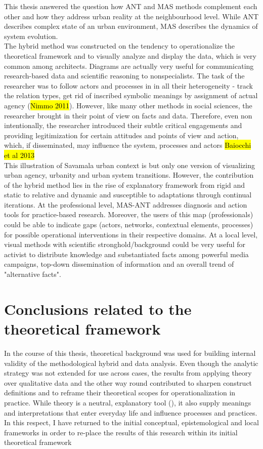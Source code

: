\documentclass[11pt]{report}
\begin{document}
This thesis answered the question how ANT and MAS methods complement each other and how they address urban reality at the neighbourhood level.
While ANT describes complex state of an urban environment, MAS describes the dynamics of system evolution.
\\
The hybrid method was constructed on the tendency to operationalize the theoretical framework and to visually analyze and display the data, which is very common among architects.
Diagrams are actually very useful for communicating research-based data and scientific reasoning to nonspecialists.
The task of the researcher was to follow actors and processes in in all their heterogeneity - track the relation types,  get rid of inscribed symbolic meanings by assignment of actual agency (\hl{Nimmo 2011}).
However, like many other methods in social sciences, 
the researcher brought in their point of view on facts and data.
Therefore, even non intentionally, the researcher introduced their subtle critical engagements and providing legitimization for certain attitudes and points of view and action, which, if disseminated, may influence the system, processes and actors \hl{Baiocchi et al 2013}
\\
This illustration of Savamala urban context is but only one version of visualizing urban agency, urbanity and urban system transitions.
However, the contribution of the hybrid method lies in the rise of explanatory framework from rigid and static to relative and dynamic and susceptible to adaptations through continual iterations.
At the professional level, MAS-ANT addresses diagnosis and action tools for practice-based research.
Moreover, the users of this map (professionals) could be able to indicate gaps (actors, networks, contextual elements, processes) for possible operational interventions in their respective domains.
At a local level, visual methods with scientific stronghold/background could be very useful for activist to distribute knowledge and substantiated facts among powerful media campaigns, top-down dissemination of information and an overall trend of "alternative facts".

\section{Conclusions related to the theoretical framework}

In the course of this thesis, theoretical background was used for building internal validity of the methodological hybrid and data analysis.
Even though the analytic strategy was not extended for use across cases, the results from applying theory over qualitative data and the other way round contributed to sharpen construct definitions and to reframe their theoretical scopes for operationalization in practice.
While theory is a neutral, explanatory tool (\cite{Sears 2008}), it also supply meanings and interpretations that enter everyday life and influence processes and practices.
In this respect, I have returned to the initial conceptual, epistemological and local frameworks in order to re-place the results of this research within its initial theoretical framework
\end{document}
